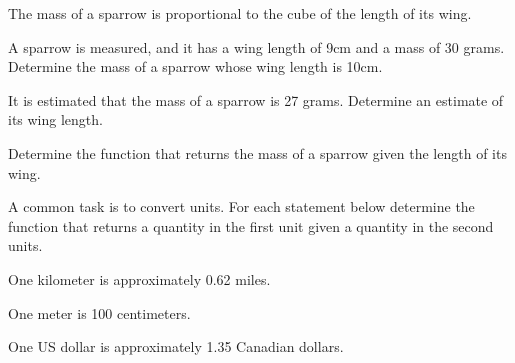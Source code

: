 \begin{problem}
\clearpage

\item The mass of a sparrow is proportional to the cube of the length of its wing.
  \begin{subproblem}
  \item \label{sparrowWingArea} A sparrow is measured, and it has a
    wing length of 9cm and a mass of 30 grams.  Determine the mass of
    a sparrow whose wing length is 10cm.  

    \vfill

  \item \label{sparrowMass} It is estimated that the mass of a sparrow
    is 27 grams. Determine an estimate of its wing length.  

    \vfill

  \item Determine the function that returns the mass of a sparrow
    given the length of its wing.

    \vfill
  \end{subproblem}

\clearpage

\item A common task is to convert units. For each statement below
  determine the function that returns a quantity in the first unit
  given a quantity in the second units.  
  \begin{subproblem}
    \item One kilometer is approximately 0.62 miles.
      \vfill
    \item One meter is 100 centimeters.
      \vfill
    \item One US dollar is approximately 1.35 Canadian dollars.
      \vfill
  \end{subproblem}


\end{problem}

\postClass

